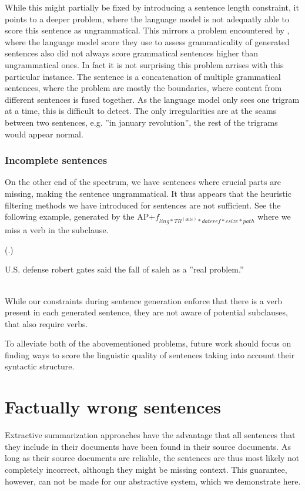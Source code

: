 \documentclass[a4paper,BCOR=10mm]{report}
\newcounter{quotecount}[chapter]
\newcommand{\countquote}[1]{\vspace{1cm}\refstepcounter{quotecount}%
     (\thechapter.\arabic{quotecount}) \hspace*{1cm} \parbox{9cm}{#1}\\[1cm]}
\numberwithin{lemma}{chapter}
\numberwithin{definition}{chapter}
\begin{document}
While this might partially be fixed by introducing a sentence length constraint, it points to a deeper problem, where the language model is not adequatly able to score this sentence as ungrammatical.
This mirrors a problem encountered by \citet{mckeown}, where the language model score they use to assess grammaticality of generated sentences also did not always score grammatical sentences higher than ungrammatical ones. In fact it is not surprising this problem arrises with this particular instance. The sentence is a concatenation of multiple grammatical sentences, where the problem are mostly the boundaries, where content from different sentences is fused together. As the language model only sees one trigram at a time, this is difficult to detect. The only irregularities are at the seams between two sentences, e.g. ''in january revolution'', the rest of the trigrams would appear normal.

\subsubsection{Incomplete sentences}

On the other end of the spectrum, we have sentences where crucial parts are missing, making the sentence ungrammatical. It thus appears that the heuristic filtering methods we have introduced for sentences are not sufficient.
See the following example, generated by the AP+$f_{ ling*TR^{(date)}*\mathit{dateref}*\mathit{csize}*\mathit{path} }$ where we miss a verb in the subclause.

\countquote{
    U.S. defense robert gates said the fall of saleh as a ''real problem.''
}

While our constraints during sentence generation enforce that there is a verb present in each generated sentence, they are not aware of potential subclauses, that also require verbs.

To alleviate both of the abovementioned problems, future work should focus on finding ways to score the linguistic quality of sentences taking into account their syntactic structure.

\section{Factually wrong sentences}

Extractive summarization approaches have the advantage that all sentences that they include in their documents have been found in their source documents. As long as their source documents are reliable, the sentences are thus most likely not completely incorrect, although they might be missing context.
This guarantee, however, can not be made for our abstractive system, which we demonstrate here.
\end{document}
